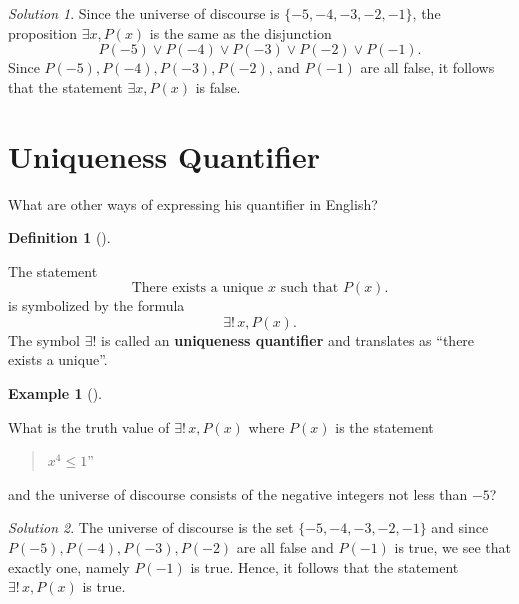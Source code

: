 \documentclass[
  letterpaper,
  10pt,
  reqno,
  twopage,
  openany]{book}
\theoremstyle{plain}
\theoremstyle{definition}
\theoremstyle{definition}
\newtheorem{definition}{Definition}[chapter]
\theoremstyle{definition}
\newtheorem{example}{Example}[chapter]
\theoremstyle{plain}
\theoremstyle{plain}
\theoremstyle{remark}
\newtheorem*{solution}{Solution}
\begin{document}
\begin{solution}

Since the universe of discourse is \(\{-5, -4, -3, -2, -1\}\), the
proposition \(\exists x, P(x)\) is the same as the disjunction \[
P(-5)\lor P(-4)\lor P(-3)\lor P(-2)\lor P(-1).
\] Since \(P(-5), P(-4), P(-3), P(-2)\), and \(P(-1)\) are all false, it
follows that the statement \(\exists x, P(x)\) is false.

\end{solution}

\hypertarget{uniqueness-quantifier}{%
\section{Uniqueness Quantifier}\label{uniqueness-quantifier}}

What are other ways of expressing his quantifier in English?

\leavevmode{}%
\begin{definition}[]\label{def-uniqueness-quantifier}

The statement \[
\text{There exists a unique $x$ such that $P(x)$.}
\] is symbolized by the formula \[
\exists! \, x, P(x).
\] The symbol \(\exists!\) is called an 
\textbf{uniqueness quantifier} and translates as ``there exists a
unique''.

\end{definition}

\leavevmode{}%
\begin{example}[]\label{exm-uq}

What is the truth value of \(\exists! \, x, P(x)\) where \(P(x)\) is the
statement

\begin{quote}
\(x^4\leq 1\)''
\end{quote}

and the universe of discourse consists of the negative integers not less
than \(-5\)?

\end{example}

\begin{solution}

The universe of discourse is the set \(\{-5, -4, -3, -2, -1\}\) and
since \(P(-5), P(-4), P(-3), P(-2)\) are all false and \(P(-1)\) is
true, we see that exactly one, namely \(P(-1)\) is true. Hence, it
follows that the statement \(\exists!\, x, P(x)\) is true.

\end{solution}
\end{document}
